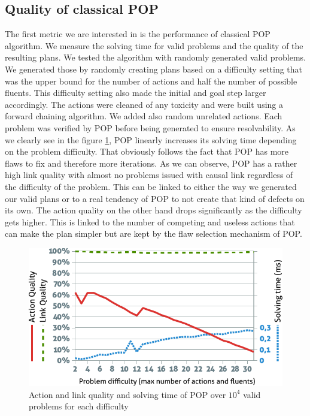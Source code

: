 \documentclass[]{article}
\begin{document}
\subsection{Quality of classical POP}\label{quality-of-classical-pop}

The first metric we are interested in is the performance of classical
POP algorithm. We measure the solving time for valid problems and the
quality of the resulting plans. We tested the algorithm with randomly
generated valid problems. We generated those by randomly creating plans
based on a difficulty setting that was the upper bound for the number of
actions and half the number of possible fluents. This difficulty setting
also made the initial and goal step larger accordingly. The actions were
cleaned of any toxicity and were built using a forward chaining
algorithm. We added also random unrelated actions. Each problem was
verified by POP before being generated to ensure resolvability. As we
clearly see in the figure \ref{fig:quality}, POP linearly increases its
solving time depending on the problem difficulty. That obviously follows
the fact that POP has more flaws to fix and therefore more iterations.
As we can observe, POP has a rather high link quality with almost no
problems issued with causal link regardless of the difficulty of the
problem. This can be linked to either the way we generated our valid
plans or to a real tendency of POP to not create that kind of defects on
its own. The action quality on the other hand drops significantly as the
difficulty gets higher. This is linked to the number of competing and
useless actions that can make the plan simpler but are kept by the flaw
selection mechanism of POP.

\begin{figure}[htbp]
\centering
\includegraphics{graphics/quality.pdf}
\caption{Action and link quality and solving time of POP over \(10^4\)
valid problems for each difficulty\label{fig:quality}}
\end{figure}
\end{document}
